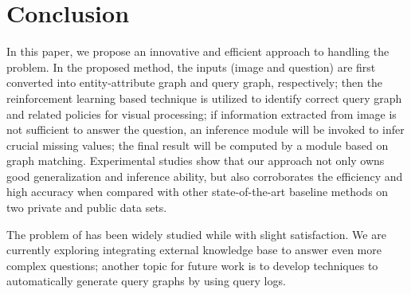 \section{Conclusion}
\label{sec-conclusion}
%


In this paper, we propose an innovative and efficient approach to handling the \vqa problem. In the proposed method, the inputs (image and question) are first converted into entity-attribute graph and query graph, respectively; then the reinforcement learning based technique is utilized to identify correct query graph and related policies for visual processing; if information extracted from image is not sufficient to answer the question, an inference module will be invoked to infer crucial missing values; the final result will be computed by a module based on graph matching. 
Experimental studies show that our approach not only owns good generalization and inference ability, but also corroborates the efficiency and high accuracy when compared with other state-of-the-art baseline methods on two private and public \vqa data sets.

The problem of \vqa has been widely studied while with slight satisfaction. We are currently exploring integrating external knowledge base to answer even more complex questions; another topic for future work is to develop techniques to automatically generate query graphs by using query logs.   

